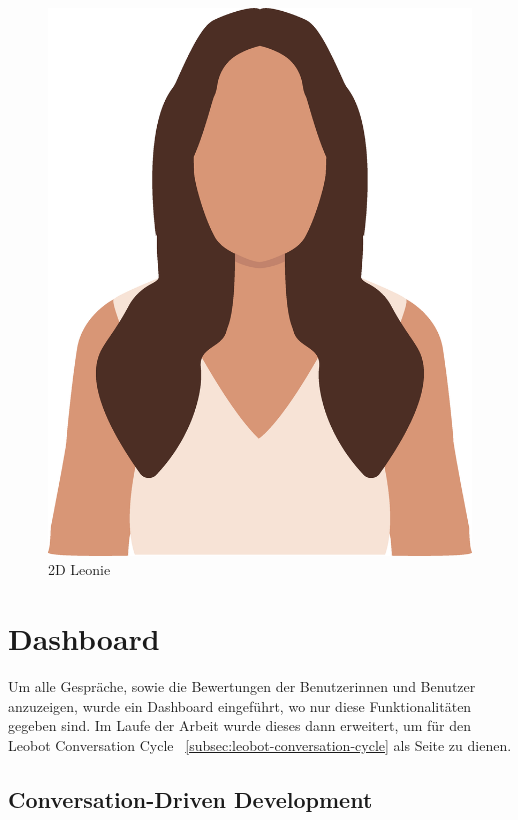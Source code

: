\begin{figure}[hbt!]
    \centering
    \includegraphics[scale=0.3]{pics/LeonieTrans}
    \caption{2D Leonie}
    \label{fig:impl:leonieTrans}
\end{figure}

\section{Dashboard}\label{sec:dashboard}

Um alle Gespräche, sowie die Bewertungen der Benutzerinnen und Benutzer anzuzeigen, wurde ein Dashboard eingeführt, wo nur diese Funktionalitäten gegeben sind.
Im Laufe der Arbeit wurde dieses dann erweitert, um für den Leobot Conversation Cycle ~\ref{subsec:leobot-conversation-cycle} als Seite zu dienen.

\subsection{Conversation-Driven Development}\label{cdd}


